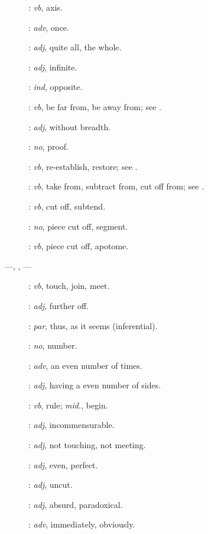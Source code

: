 {\begin{description}
\item []: {\em vb}, axis.
\item[]: {\em adv}, once.
\item[]: {\em adj}, quite all, the whole.
\item[]: {\em adj}, infinite.
\item[]: {\em ind}, opposite.
\item[]: {\em vb}, be far from, be away from; see .
\item[]: {\em adj}, without breadth.
\item[]: {\em no}, proof.
\item[]: {\em vb}, re-establish, restore; see .
\item[]: {\em vb}, take from, subtract from, cut off from; see .
\item[]: {\em vb}, cut off, subtend.
\item[]: {\em no}, piece cut off, segment.
\item[]: {\em vb}, piece cut off, apotome.
\item[ ---, , ---]: {\em vb},  touch, join, meet.
\item[]: {\em adj}, further off.
\item[]: {\em par}, thus, as it seems (inferential).
\item []: {\em no}, number.
\item[]: {\em adv}, an even number of times.
\item[]: {\em adj}, having a even number of sides.
\item[]: {\em vb},
rule; {\em mid.}, begin.
\item[]: {\em adj}, incommensurable.
\item[]: {\em adj}, not touching, not meeting.
\item[]: {\em adj}, even, perfect.
\item[]: {\em adj}, uncut.
\item[]: {\em adj}, absurd, paradoxical.
\item[]: {\em adv}, immediately, obviously.

\end{description}}
